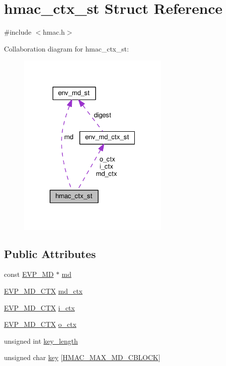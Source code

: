 \hypertarget{structhmac__ctx__st}{}\section{hmac\+\_\+ctx\+\_\+st Struct Reference}
\label{structhmac__ctx__st}


{\ttfamily \#include $<$hmac.\+h$>$}



Collaboration diagram for hmac\+\_\+ctx\+\_\+st\+:
\nopagebreak
\begin{figure}[H]
\begin{center}
\leavevmode
\includegraphics[width=208pt]{structhmac__ctx__st__coll__graph}
\end{center}
\end{figure}
\subsection*{Public Attributes}
\begin{DoxyCompactItemize}
\item 
const \hyperlink{ossl__typ_8h_aac66cf010326fa9a927c2a34888f45d3}{E\+V\+P\+\_\+\+MD} $\ast$ \hyperlink{structhmac__ctx__st_a9aaff763ed7d862ad49ffa19073deac5}{md}
\item 
\hyperlink{ossl__typ_8h_a69cda4d21bd068f01c469222c1dd92fe}{E\+V\+P\+\_\+\+M\+D\+\_\+\+C\+TX} \hyperlink{structhmac__ctx__st_a47d4d66a70519722df931e144dbc77a0}{md\+\_\+ctx}
\item 
\hyperlink{ossl__typ_8h_a69cda4d21bd068f01c469222c1dd92fe}{E\+V\+P\+\_\+\+M\+D\+\_\+\+C\+TX} \hyperlink{structhmac__ctx__st_aa702847295c2c2c40f6093936b89a829}{i\+\_\+ctx}
\item 
\hyperlink{ossl__typ_8h_a69cda4d21bd068f01c469222c1dd92fe}{E\+V\+P\+\_\+\+M\+D\+\_\+\+C\+TX} \hyperlink{structhmac__ctx__st_a9ac033d3f121ddbb6329e68825318ad8}{o\+\_\+ctx}
\item 
unsigned int \hyperlink{structhmac__ctx__st_a7330fd76130fea0171458261bfc11226}{key\+\_\+length}
\item 
unsigned char \hyperlink{structhmac__ctx__st_a67cdff832dfb8cf2bf7affb9634ef82a}{key} \mbox{[}\hyperlink{hmac_8h_a70c2f521a62974fcae381df08f89c7a7}{H\+M\+A\+C\+\_\+\+M\+A\+X\+\_\+\+M\+D\+\_\+\+C\+B\+L\+O\+CK}\mbox{]}
\end{DoxyCompactItemize}


